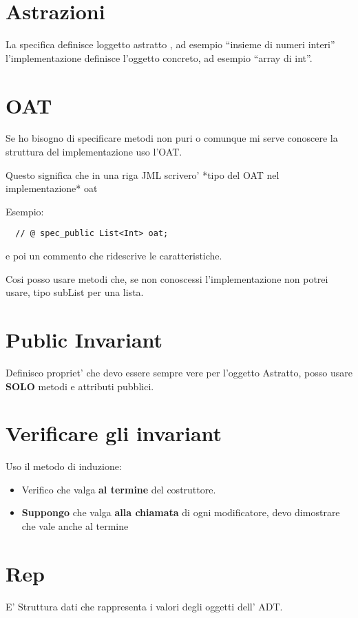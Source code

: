 \documentclass[\main/main.tex]{subfiles}
\begin{document}
\section{Astrazioni}
La specifica definisce loggetto astratto , ad esempio ``insieme di numeri interi'' l'implementazione definisce l'oggetto concreto, ad esempio ``array di int''.

\section{OAT}
Se ho bisogno di specificare metodi non puri o comunque mi serve conoscere la struttura del implementazione uso l'OAT.

Questo significa che in una riga JML scrivero' *tipo del OAT nel implementazione* oat

Esempio:

\begin{verbatim}
  // @ spec_public List<Int> oat;
\end{verbatim}

e poi un commento che ridescrive le caratteristiche.

Cosi posso usare metodi che, se non conoscessi l'implementazione non potrei usare, tipo subList per una lista.

\section{Public Invariant}
Definisco propriet' che devo essere sempre vere per l'oggetto Astratto,
posso usare \textbf{SOLO} metodi e attributi pubblici.

\section{Verificare gli invariant}
Uso il metodo di induzione:
\begin{itemize}
\item Verifico che valga \textbf{al termine} del costruttore.
\item \textbf{Suppongo} che valga \textbf{alla chiamata} di ogni modificatore, devo dimostrare che vale anche al termine
\end{itemize}

\section{Rep}
E' Struttura dati che rappresenta i valori degli oggetti dell' ADT.
\end{document}
